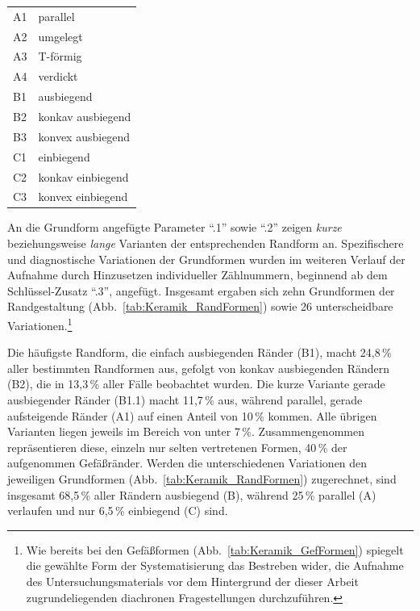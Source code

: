\begin{multicols}{2}
\vspace{1em}
\noindent\begin{tabular}{@{}ll@{}}
A1 & parallel \\
A2 & umgelegt \\
A3 & T-förmig \\
A4 & verdickt \\
B1 & ausbiegend \\
B2 & konkav ausbiegend \\
B3 & konvex ausbiegend \\
C1 & einbiegend \\
C2 & konkav einbiegend \\
C3 & konvex einbiegend \\
\end{tabular}
\vspace{1em}

\noindent An die Grundform angefügte Parameter \enquote{.1} sowie \enquote{.2} zeigen \textit{kurze} beziehungsweise \textit{lange} Varianten der entsprechenden Randform an. Spezifischere und diagnostische Variationen der Grundformen wurden im weiteren Verlauf der Aufnahme durch Hinzusetzen individueller Zählnummern, beginnend ab dem Schlüssel-Zusatz \enquote{.3}, angefügt. Insgesamt ergaben sich zehn Grundformen der Randgestaltung (Abb.~\ref{tab:Keramik_RandFormen}) sowie 26 unterscheidbare Variationen.\footnote{Wie bereits bei den Gefäßformen (Abb.~\ref{tab:Keramik_GefFormen}) spiegelt die gewählte Form der Systematisierung das Bestreben wider, die Aufnahme des Untersuchungsmaterials vor dem Hintergrund der dieser Arbeit zugrundeliegenden diachronen Fragestellungen durchzuführen.}

Die häufigste Randform, die einfach ausbiegenden Ränder (B1), macht 24,8\,\% aller bestimmten Randformen aus, gefolgt von konkav ausbiegenden Rändern (B2), die in 13,3\,\% aller Fälle beobachtet wurden. Die kurze Variante gerade ausbiegender Ränder (B1.1) macht 11,7\,\% aus, während parallel, gerade aufsteigende Ränder (A1) auf einen Anteil von 10\,\% kommen. Alle übrigen Varianten liegen jeweils im Bereich von unter 7\,\%. Zusammengenommen repräsentieren diese, einzeln nur selten vertretenen Formen, 40\,\% der aufgenommen Gefäßränder. Werden die unterschiedenen Variationen den jeweiligen Grundformen (Abb.~\ref{tab:Keramik_RandFormen}) zugerechnet, sind insgesamt 68,5\,\% aller Rändern ausbiegend (B), während 25\,\% parallel (A) verlaufen und nur 6,5\,\% einbiegend (C) sind.


\end{multicols}
